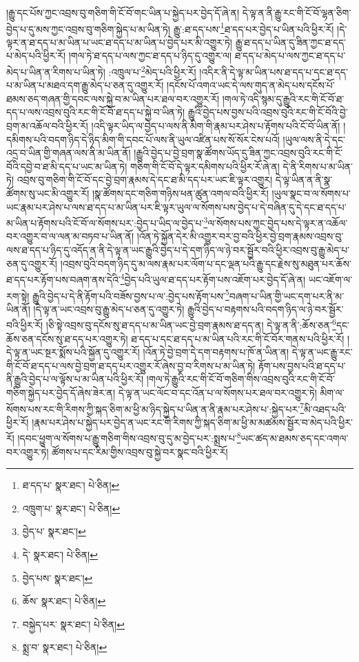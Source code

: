 །རྒྱུ་དང་པོས་ཀྱང་འབྲས་བུ་གཅིག་གི་ངོ་བོ་གང་ཡིན་པ་སྐྱེད་པར་བྱེད་དོ་ཞེ་ན། དེ་ལྟ་ན་ནི་རྒྱུ་རང་གི་ངོ་བོ་ལྷན་ཅིག་བྱེད་པ་དུ་མས་ཀྱང་འབྲས་བུ་གཅིག་སྐྱེད་པ་མ་ཡིན་ཏེ། རྒྱུ་:ཐ་དད་པས་\footnote{ཐ་དད་པ་  སྣར་ཐང་།  པེ་ཅིན། }ཐ་དད་པར་བྱེད་པ་ཡིན་པའི་ཕྱིར་རོ། །དེ་ལྟར་ན་ཐ་དད་པ་མ་ཡིན་པ་ཡང་ཐ་དད་པ་མ་ཡིན་པ་བྱེད་པར་མི་འགྱུར་ཏེ། རྒྱུ་ཐ་དད་པ་ཡིན་དུ་ཟིན་ཀྱང་ཐ་དད་པ་མེད་པའི་ཕྱིར་རོ། །གལ་ཏེ་ཐ་དད་པ་ལས་ཀྱང་ཐ་དད་པ་ཉིད་དུ་འགྱུར་ལ། ཐ་དད་པ་མེད་པ་ལས་ཀྱང་ཐ་དད་པ་མེད་པ་ཡིན་ན་རིགས་པ་ཡིན་ཏེ། :འཁྲུལ་པ་\footnote{འཁྲུག་པ་  སྣར་ཐང་།  པེ་ཅིན། }མེད་པའི་ཕྱིར་རོ། །འདིར་ནི་དེ་ལྟ་མ་ཡིན་པས་ཐ་དད་པ་དང་ཐ་དད་པ་མ་ཡིན་པ་མཐའ་དག་རྒྱུ་མེད་པ་ཅན་དུ་འགྱུར་རོ། །དངོས་པོ་འགའ་ཡང་དེ་ལས་གུད་ན་མེད་པས་དངོས་པོ་ཐམས་ཅད་གཞན་གྱི་དབང་ལས་སྐྱེ་བ་མ་ཡིན་པར་ཐལ་བར་འགྱུར་རོ། །གལ་ཏེ་འདི་སྙམ་དུ་རྒྱུའི་རང་གི་ངོ་བོ་ཐ་དད་པ་ལས་འབྲས་བུའི་རང་གི་ངོ་བོ་ཐ་དད་པ་སྐྱེ་བ་ཡིན་ཏེ། རྒྱུའི་བྱེད་པས་བྱས་པའི་འབྲས་བུའི་རང་གི་ངོ་བོའི་བྱེ་བྲག་མ་འཆོལ་བའི་ཕྱིར་རོ། །འདི་ལྟར་ཡིད་ལ་བྱེད་པ་ལས་ནི་མིག་གི་རྣམ་པར་ཤེས་པ་རྟོགས་པའི་ངོ་བོ་ཡིན་ནོ། །དམིགས་པའི་བདག་ཉིད་དེ་ཉིད་མིག་གི་དབང་པོ་ལས་ནི་ཡུལ་འཛིན་པས་སོ་སོར་ངེས་པའོ། །ཡུལ་ལས་ནི་དེ་དང་འདྲ་བ་ཡིན་གྱི་གཞན་ལས་ནི་མ་ཡིན་ནོ། །རྒྱུའི་བྱེད་པ་བྱེ་བྲག་སྣ་ཚོགས་ཡོད་དུ་ཟིན་ཀྱང་འབྲས་བུའི་རང་གི་ངོ་བོའི་དབྱེ་བ་ཐ་མི་དད་པ་ཡང་མ་ཡིན་ཏེ། གཅིག་གི་ངོ་བོ་དེ་ལྟར་དམིགས་པའི་ཕྱིར་རོ་ཞེ་ན། དེ་ནི་རིགས་པ་མ་ཡིན་ཏེ། འབྲས་བུ་གཅིག་གི་ངོ་བོ་དང་བྱེ་བྲག་རྣམས་དེ་དང་ཐ་མི་དད་པར་ཡང་ཇི་ལྟར་འགྱུར། དེ་ལྟ་ཡིན་ན་ནི་སྣ་ཚོགས་སུ་ཡང་མི་འགྱུར་རོ། །སྣ་ཚོགས་དང་གཅིག་གཉིས་ཕན་ཚུན་འགལ་བའི་ཕྱིར་རོ། །ཡུལ་སྣང་བ་ལ་སོགས་པ་ཡང་རྣམ་པར་ཤེས་པ་ལས་ཐ་དད་པ་མ་ཡིན་པར་ཇི་ལྟར་ཡུལ་ལ་སོགས་པས་བྱེད་པ་དེ་བཞིན་དུ་དེ་དང་ཐ་དད་པ་མ་ཡིན་པ་རྟོགས་པའི་ངོ་བོ་ལ་སོགས་པར་:བྱེད་པ་ཡིད་ལ་བྱེད་པ་\footnote{བྱེད་པ་  སྣར་ཐང་། }ལ་སོགས་པས་ཀྱང་བྱེད་པས་དེ་ལྟར་ན་འཆོལ་བར་འགྱུར་བ་ལ་ལན་མ་བཏབ་པ་ཡིན་ནོ། །འོན་ཏེ་སྐྱོན་དེར་མི་འགྱུར་བར་བྱ་བའི་ཕྱིར་བྱེ་བྲག་རྣམས་འབྲས་བུ་ལས་ཐ་དད་པ་ཉིད་དུ་འདོད་ན་ནི་དེ་ལྟ་ན་ཡང་རྒྱུའི་བྱེད་པ་དེ་དག་ཉིད་ལ་ཉེ་བར་སྦྱོར་བའི་ཕྱིར་འབྲས་བུ་རྒྱུ་མེད་པ་ཅན་དུ་འགྱུར་རོ། །འབྲས་བུའི་བདག་ཉིད་དུ་མ་ལས་རྣམ་པར་ལོག་པ་དང་ལྡན་པའི་རྒྱུ་དང་རྗེས་སུ་མཐུན་པར་ཆོས་ཐ་དད་པར་རྟོག་པས་བཞག་ནས་དེའི་\footnote{དེ་  སྣར་ཐང་།  པེ་ཅིན། }བྱེད་པའི་ཡུལ་ཐ་དད་པར་རྟོག་པས་འཇོག་པར་བྱེད་དོ་ཞེ་ན། ཡང་འཇོག་ལ་རག་སྟེ། རྒྱུའི་བྱེད་པ་དེ་ནི་རྟོག་པའི་བཟོས་བྱས་པ་ལ་:བྱེད་པས་རྟོག་པས་\footnote{བྱེད་པས་  སྣར་ཐང་། }བཞག་པ་ཡིན་གྱི་ཡང་དག་པར་ནི་མ་ཡིན་ནོ། །དེ་ལྟ་ན་ཡང་འབྲས་བུ་རྒྱུ་མེད་པ་ཅན་དུ་འགྱུར་ཏེ། རྒྱུའི་བྱེད་པ་བརྟགས་པའི་བདག་ཉིད་ལ་ཉེ་བར་སྦྱོར་བའི་ཕྱིར་རོ། །ཅི་སྟེ་འབྲས་བུ་དངོས་སུ་ཐ་དད་པ་མ་ཡིན་ཡང་བྱེ་བྲག་རྣམས་ཐ་དད་ན། དེ་ལྟ་ན་ནི་:ཆོས་ཅན་\footnote{ཆོས་  སྣར་ཐང་།  པེ་ཅིན། }དང་ཆོས་ཅན་དངོས་སུ་ཐ་དད་པར་འགྱུར་ཏེ། ཐ་དད་པ་དང་ཐ་དད་པ་མ་ཡིན་པའི་རང་གི་ངོ་བོར་གནས་པའི་ཕྱིར་རོ། །དེ་ལྟ་ན་ཡང་སྔར་སྨོས་པའི་སྐྱོན་དུ་འགྱུར་རོ། །འོན་ཏེ་བྱེ་བྲག་དེ་དག་བརྟགས་པ་ཁོ་ན་ཡིན་ན། དེ་ལྟ་ན་ཡང་རྒྱུ་རང་གི་ངོ་བོ་ཐ་དད་པ་ལས་བྱེ་བྲག་ཐ་དད་པར་འགྱུར་རོ་ཞེས་བྱ་བ་རིགས་པ་མ་ཡིན་ཏེ། རྟོག་པས་བྱས་པའི་ཐ་དད་པ་ནི་རྒྱུའི་བྱེད་པ་ལ་ལྟོས་པ་མ་ཡིན་པའི་ཕྱིར་རོ། །གལ་ཏེ་རྒྱུའི་རང་གི་ངོ་བོ་གཅིག་གིས་འབྲས་བུའི་རང་གི་ངོ་བོ་གཅིག་སྐྱེད་པར་བྱེད་དོ་ཞེས་ཟེར་ན། དེ་ལྟ་ན་ཡང་ལོང་བ་དང་འོན་པ་ལ་སོགས་པར་ཐལ་བར་འགྱུར་ཏེ། མིག་ལ་སོགས་པས་རང་གི་རིགས་ཀྱི་སྐད་ཅིག་མ་ཕྱི་མ་ཉིད་སྐྱེད་པ་ཡིན་ན་ནི་རྣམ་པར་ཤེས་པ་:སྐྱེད་པར་\footnote{བསྐྱེད་པར་  སྣར་ཐང་།  པེ་ཅིན། }མི་འཐད་པའི་ཕྱིར་རོ། །རྣམ་པར་ཤེས་པ་སྐྱེད་པར་བྱེད་ན་ཡང་རང་གི་རིགས་ཀྱི་སྐད་ཅིག་མ་ཕྱི་མ་མཚམས་སྦྱོར་བ་མེད་པའི་ཕྱིར་རོ། །དབང་ཕྱུག་ལ་སོགས་པ་རྒྱུ་གཅིག་གིས་འབྲས་བུ་དུ་མ་བྱེད་པར་:སྨྲས་པ་\footnote{སྨྲ་བ་  སྣར་ཐང་།  པེ་ཅིན། }ཡང་ཚད་མ་ཐམས་ཅད་དང་འགལ་བར་འགྱུར་ཏེ། ཚོགས་པ་དང་རིམ་གྱིས་འབྲས་བུ་སྐྱེ་བར་སྣང་བའི་ཕྱིར་རོ། 